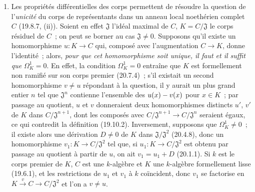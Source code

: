 \begin{remarks}[21.5.3]
\label{0.21.5.3-fr}
\begin{enumerate}
  \item[(i)] Les propriétés différentielles des corps permettent de résoudre la
  question de l'\emph{unicité} du corps de représentants dans un anneau local
  noethérien complet $C$ (19.8.7, (ii)). Soient en effet $\mathfrak J$ l'idéal maximal
  de $C$, $K=C/\mathfrak J$ le corps résiduel de $C$~; on peut se borner au
  cas $\mathfrak J\ne0$. Supposons qu'il existe un homomorphisme $u:K\to C$
  qui, composé avec l'augmentation $C\to K$, donne l'identité~; alors, \emph{pour
  que cet homomorphisme soit unique, il faut et il suffit que}
  $\Omega^1_K=0$. En effet, la condition $\Omega^1_K=0$ entraîne que $K$ est
  formellement non ramifié sur son corps premier (20.7.4)~; s'il existait un
  second homomorphisme $v\ne u$ répondant à la question, il y aurait un plus
  grand entier $n$ tel que $\mathfrak J^n$ contienne l'ensemble des
  $u(x)- v(x)$ pour $x\in K$~; par passage au quotient, $u$ et $v$ donneraient
  deux homomorphismes distincts $u'$, $v'$ de $K$ dans
  $C/\mathfrak J^{n+1}$, dont les composés avec
  $C/\mathfrak J^{n+1}\to C/\mathfrak J^n$ seraient égaux, ce qui contredit
  la définition (19.10.2). Inversement, supposons que $\Omega^1_K\ne0$~; il
  existe alors une dérivation $D\ne0$ de $K$ dans
  $\mathfrak J/\mathfrak J^2$ (20.4.8), donc un homomorphisme
  $v_1:K\to C/\mathfrak J^2$ tel que, si $u_1:K\to C/\mathfrak J^2$ est
  obtenu par passage au quotient à partir de $u$, on ait $v_1=u_1+D$
  (20.1.1). Si $k$ est le corps premier de $K$, $C$ est une $k$-algèbre et
  $K$ une $k$-algèbre formellement lisse (19.6.1), et les restrictions de
  $u_1$ et $v_1$ à $k$ coïncident, donc $v_1$ se factorise en
  $K\xrightarrow{v}C\to C/\mathfrak J^2$ et l'on a $v\ne u$.


\end{enumerate}
\end{remarks}
